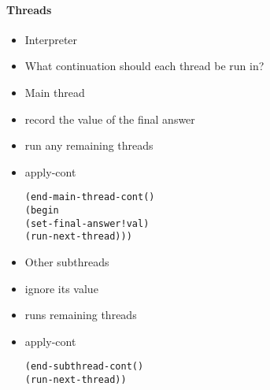 \documentclass{beamer}
\begin{document}
\begin{frame}[fragile]
\framesubtitle{Threads}
\begin{scriptsize}
\begin{itemize}
\item<1-> Interpreter

\item<1-> What continuation should each thread be run in?

\item<2-> Main thread

\item<2-> record the value of the final answer

\item<2-> run any remaining threads

\item<3-> apply-cont
\begin{alltt}
	(end-main-thread-cont ()
      (begin 
        (set-final-answer! val)
        (run-next-thread)))
\end{alltt}

\item<4-> Other subthreads

\item<4-> ignore its value

\item<4-> runs remaining threads

\item<5-> apply-cont
\begin{alltt}
    (end-subthread-cont () 
      (run-next-thread))
\end{alltt}

\end{itemize}
\end{scriptsize}
\end{frame}
\end{document}
